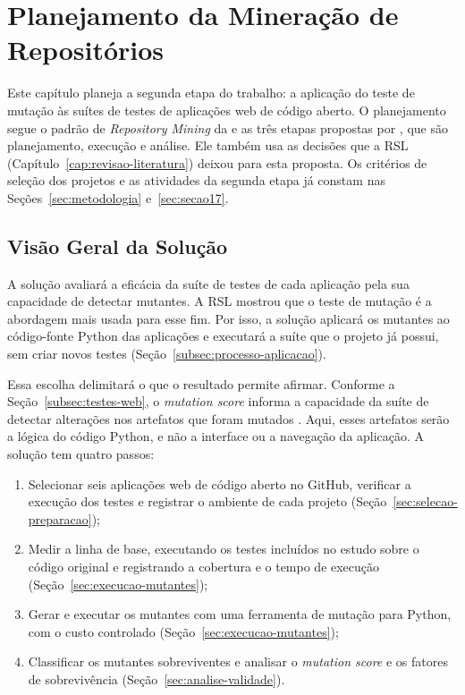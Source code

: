 \chapter{Planejamento da Mineração de Repositórios}
\label{cap:planejamento-tcc2}

Este capítulo planeja a segunda etapa do trabalho: a aplicação do teste de mutação às suítes de testes de aplicações web de código aberto. O planejamento segue o padrão de \textit{Repository Mining} da  e as três etapas propostas por , que são planejamento, execução e análise. Ele também usa as decisões que a RSL (Capítulo~\ref{cap:revisao-literatura}) deixou para esta proposta. Os critérios de seleção dos projetos e as atividades da segunda etapa já constam nas Seções~\ref{sec:metodologia} e~\ref{sec:secao17}.

\section{Visão Geral da Solução}
\label{sec:visao-geral-solucao}

A solução avaliará a eficácia da suíte de testes de cada aplicação pela sua capacidade de detectar mutantes. A RSL mostrou que o teste de mutação é a abordagem mais usada para esse fim. Por isso, a solução aplicará os mutantes ao código-fonte Python das aplicações e executará a suíte que o projeto já possui, sem criar novos testes (Seção~\ref{subsec:processo-aplicacao}).

Essa escolha delimitará o que o resultado permite afirmar. Conforme a Seção~\ref{subsec:testes-web}, o \textit{mutation score} informa a capacidade da suíte de detectar alterações nos artefatos que foram mutados \cite{li2014webtesting}. Aqui, esses artefatos serão a lógica do código Python, e não a interface ou a navegação da aplicação. A solução tem quatro passos:

\begin{enumerate}
    \item Selecionar seis aplicações web de código aberto no GitHub, verificar a execução dos testes e registrar o ambiente de cada projeto (Seção~\ref{sec:selecao-preparacao});
    \item Medir a linha de base, executando os testes incluídos no estudo sobre o código original e registrando a cobertura e o tempo de execução (Seção~\ref{sec:execucao-mutantes});
    \item Gerar e executar os mutantes com uma ferramenta de mutação para Python, com o custo controlado (Seção~\ref{sec:execucao-mutantes});
    \item Classificar os mutantes sobreviventes e analisar o \textit{mutation score} e os fatores de sobrevivência (Seção~\ref{sec:analise-validade}).
\end{enumerate}

